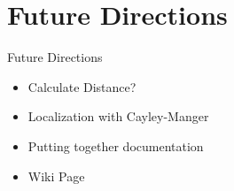\documentclass{beamer}
\begin{document}

\section{Future Directions}

\begin{frame}{Future Directions}{}
    \begin{itemize}
        \item Calculate Distance?
        \item Localization with Cayley-Manger
        \item Putting together documentation
        \item Wiki Page
    \end{itemize}
\end{frame}
\end{document}
